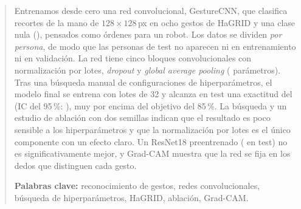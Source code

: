\begin{abstract}
\noindent
Entrenamos desde cero una red convolucional, GestureCNN, que clasifica recortes de la mano de
$128\times128$\,px en ocho gestos de HaGRID y una clase nula (), pensados como
órdenes para un robot. Los datos se dividen \emph{por persona}, de modo que las \PersonasTest{}
personas de test no aparecen ni en entrenamiento ni en validación. La red tiene cinco bloques
convolucionales con normalización por lotes, \emph{dropout} y \emph{global average pooling}
(\ParamsFinal{} parámetros). Tras una búsqueda manual de \NConfigsBusqueda{} configuraciones de
hiperparámetros, el modelo final se entrena con lotes de 32 y alcanza en test una exactitud del
\AccTestFinal{} (IC del 95\,\%: \AccTestFinalIC), muy por encima del objetivo del 85\,\%. La
búsqueda y un estudio de ablación con dos semillas indican que el resultado es poco sensible a los
hiperparámetros y que la normalización por lotes es el único componente con un efecto claro. Un
ResNet18 preentrenado (\AccTestResnet{} en test) no es significativamente mejor, y Grad-CAM
muestra que la red se fija en los dedos que distinguen cada gesto.

\medskip\noindent\textbf{Palabras clave:} reconocimiento de gestos, redes convolucionales,
búsqueda de hiperparámetros, HaGRID, ablación, Grad-CAM.
\end{abstract}
